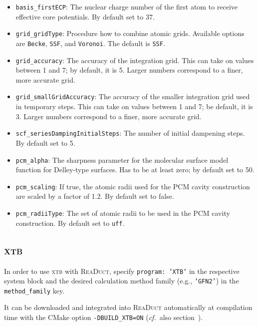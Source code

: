 \documentclass[]{tufte-book}
\begin{document}
\begin{itemize}
\item \texttt{basis\_firstECP}: The nuclear charge number of the first atom to receive effective core potentials. By default set to 37.
\item \texttt{grid\_gridType}: Procedure how to combine atomic grids. Available options are \texttt{Becke}\cite{Becke1988}, \texttt{SSF}\cite{Stratmann1996}, and \texttt{Voronoi}. The default is \texttt{SSF}.
\item \texttt{grid\_accuracy}: The accuracy of the integration grid. This can take on values between 1 and 7; by default, it is 5. Larger numbers correspond to a finer, more accurate grid.
\item \texttt{grid\_smallGridAccuracy}: The accuracy of the smaller integration grid used in temporary steps. This can take on values between 1 and 7; be default, it is 3. Larger numbers correspond to a finer, more accurate grid.
\item \texttt{scf\_seriesDampingInitialSteps}: The number of initial dampening steps. By default set to 5.
\item \texttt{pcm\_alpha}: The sharpness parameter for the molecular surface model function for Delley-type surfaces. Has to be at least zero; by default set to 50.
\item \texttt{pcm\_scaling}: If true, the atomic radii used for the PCM cavity construction are scaled by a factor of 1.2. By default set to false.
\item \texttt{pcm\_radiiType}: The set of atomic radii to be used in the PCM cavity construction. By default set to \texttt{uff}.
\end{itemize}


\subsection{\textsc{xtb}}

In order to use \textsc{xtb} with \textsc{ReaDuct}, specify \texttt{program: 'XTB'} in the respective system block and the desired
calculation method family (e.g., \texttt{'GFN2'}) in the \texttt{method\_family} key.

It can be downloaded and integrated into \textsc{ReaDuct} automatically at compilation time with the CMake option \texttt{-DBUILD\_XTB=ON} (\textit{cf.}~also section~).
\end{document}
